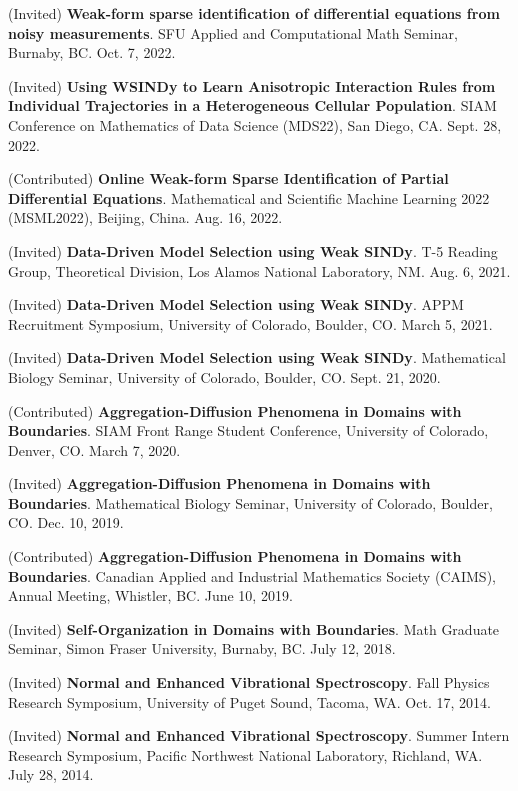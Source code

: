 \documentclass[letterpaper,11pt,oneside]{article}
\begin{document}
\begin{enumerate}[label={[\arabic*]}]
\item (Invited) \textbf{Weak-form sparse identification of differential equations from noisy measurements}. SFU Applied and Computational Math Seminar, Burnaby, BC. Oct. 7, 2022.
\item (Invited) \textbf{Using WSINDy to Learn Anisotropic Interaction 
Rules from Individual Trajectories in a Heterogeneous Cellular Population}. SIAM Conference on Mathematics of Data Science (MDS22), San Diego, CA. Sept. 28, 2022.
\item (Contributed) \textbf{Online Weak-form Sparse Identification of Partial Differential Equations}. Mathematical and Scientific Machine Learning 2022 (MSML2022), Beijing, China. Aug. 16, 2022.
\item (Invited) \textbf{Data-Driven Model Selection using Weak SINDy}. T-5 Reading Group, Theoretical Division, Los Alamos National Laboratory, NM. Aug. 6, 2021.
\item (Invited) \textbf{Data-Driven Model Selection using Weak SINDy}. APPM Recruitment Symposium, University of Colorado, Boulder, CO. March 5, 2021.
\item (Invited) \textbf{Data-Driven Model Selection using Weak SINDy}. Mathematical Biology Seminar, University of Colorado, Boulder, CO. Sept. 21, 2020.
\item (Contributed) \textbf{Aggregation-Diffusion Phenomena in Domains with Boundaries}. SIAM Front Range Student Conference, University of Colorado, Denver, CO. March 7, 2020.
\item (Invited) \textbf{Aggregation-Diffusion Phenomena in Domains with Boundaries}. Mathematical Biology Seminar, University of Colorado, Boulder, CO. Dec. 10, 2019.
\item (Contributed) \textbf{Aggregation-Diffusion Phenomena in Domains with Boundaries}. Canadian Applied and Industrial Mathematics Society (CAIMS), Annual Meeting, Whistler, BC. June 10, 2019.
\item (Invited) \textbf{Self-Organization in Domains with Boundaries}. Math Graduate Seminar, Simon Fraser University, Burnaby, BC. July 12, 2018.
\item (Invited) \textbf{Normal and Enhanced Vibrational Spectroscopy}. Fall Physics Research Symposium, University of Puget Sound, Tacoma, WA. Oct. 17, 2014.
\item (Invited) \textbf{Normal and Enhanced Vibrational Spectroscopy}. Summer Intern Research Symposium, Pacific Northwest National Laboratory, Richland, WA. July 28, 2014.
\end{enumerate}
\end{document}
